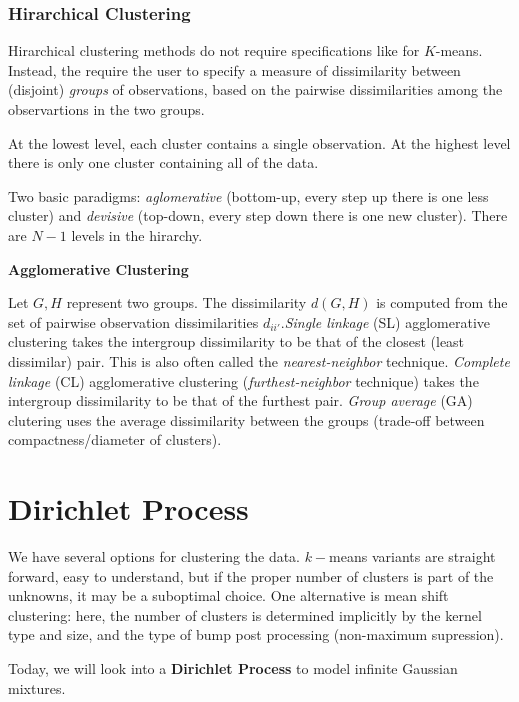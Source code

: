 \documentclass{scrartcl}
\begin{document}
\subsubsection{Hirarchical Clustering}
Hirarchical clustering methods do not require specifications like for \(K\)-means. Instead, the require the user to specify a measure of dissimilarity between (disjoint) \textit{groups} of observations, based on the pairwise dissimilarities among the observartions in the two groups.

At the lowest level, each cluster contains a single observation. At the highest level there is only one cluster containing all of the data.

Two basic paradigms: \textit{aglomerative} (bottom-up, every step up there is one less cluster) and \textit{devisive} (top-down, every step down there is one new cluster). There are \(N-1\) levels in the hirarchy.

\textbf{Agglomerative Clustering}

Let \(G, H\) represent two groups. The dissimilarity \(d(G,H)\) is computed from the set of pairwise observation dissimilarities \(d_{ii'}\).\textit{Single linkage} (SL) agglomerative clustering takes the intergroup dissimilarity to be that of the closest (least dissimilar) pair. This is also often called the \textit{nearest-neighbor} technique. \textit{Complete linkage} (CL) agglomerative clustering (\textit{furthest-neighbor} technique) takes the intergroup dissimilarity to be that of the furthest pair. \textit{Group average} (GA) clutering uses the average dissimilarity between the groups (trade-off between compactness/diameter of clusters).

\section{Dirichlet Process}
We have several options for clustering the data. \(k-\)means variants are straight forward, easy to understand, but if the proper number of clusters is part of the unknowns, it may be a suboptimal choice. One alternative is mean shift clustering: here, the number of clusters is determined implicitly by the kernel type and size, and the type of bump post processing (non-maximum supression).

Today, we will look into a \textbf{Dirichlet Process} to model infinite Gaussian mixtures.

\bigbreak
\end{document}
